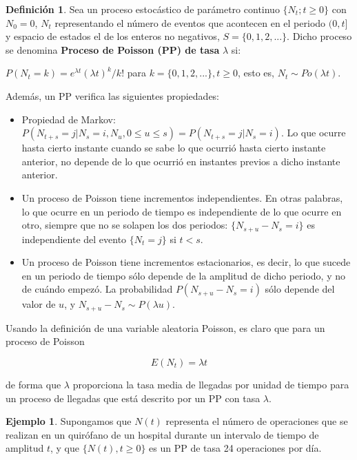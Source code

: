 \documentclass[
]{book}
\providecommand{\tightlist}{%
  \setlength{\itemsep}{0pt}\setlength{\parskip}{0pt}}
\newenvironment{yellowbox}{
  \definecolor{shadecolor}{rgb}{210, 180, 140}  
  \color{black}
  \begin{shaded}}
 {\end{shaded}}
\theoremstyle{definition}
\newtheorem{definition}{Definición}[chapter]
\theoremstyle{definition}
\newtheorem{example}{Ejemplo}[chapter]
\theoremstyle{definition}
\theoremstyle{definition}
\theoremstyle{remark}
\begin{document}
\begin{yellowbox}

\begin{definition}

Sea un proceso estocástico de parámetro continuo \(\{N_t; t \geq 0\}\) con \(N_0 = 0\), \(N_t\) representando el número de eventos que acontecen en el periodo \((0,t]\) y espacio de estados el de los enteros no negativos, \(S=\{0,1,2,...\}\). Dicho proceso se denomina \textbf{Proceso de Poisson (PP) de tasa} \(\lambda\) si:

\(P(N_t = k) = e^{\lambda t}(\lambda t)^k/k!\) para \(k=\{0,1,2,...\}, t \geq 0\), esto es, \(N_t \sim Po(\lambda t)\).

Además, un PP verifica las siguientes propiedades:

\begin{itemize}
\tightlist
\item
  Propiedad de Markov: \(P(N_{t+s} = j|N_s=i, N_u, 0\leq u \leq s)=P(N_{t+s} = j|N_s=i)\). Lo que ocurre hasta cierto instante cuando se sabe lo que ocurrió hasta cierto instante anterior, no depende de lo que ocurrió en instantes previos a dicho instante anterior.
\item
  Un proceso de Poisson tiene incrementos independientes. En otras palabras, lo que ocurre en un periodo de tiempo es independiente de lo que ocurre en otro, siempre que no se solapen los dos periodos: \(\{N_{s+u} - N_s = i\}\) es independiente del evento \(\{N_t = j\}\) si \(t<s\).
\item
  Un proceso de Poisson tiene incrementos estacionarios, es decir, lo que sucede en un periodo de tiempo sólo depende de la amplitud de dicho periodo, y no de cuándo empezó. La probabilidad \(P(N_{s+u} - N_s = i)\) sólo depende del valor de \(u\), y \(N_{s+u} - N_s \sim P(\lambda u)\).
\end{itemize}

\end{definition}

\end{yellowbox}

Usando la definición de una variable aleatoria Poisson, es claro que para un proceso de Poisson

\[E(N_t) = \lambda t\]

de forma que \(\lambda\) proporciona la tasa media de llegadas por unidad de tiempo para un proceso de llegadas que está descrito por un PP con tasa \(\lambda\).

\begin{example}
\protect\hypertarget{exm:pp000}{}\label{exm:pp000}Supongamos que \(N(t)\) representa el número de operaciones que se realizan en un quirófano de un hospital durante un intervalo de tiempo de amplitud \(t\), y que \(\{N(t), t\geq0\}\) es un PP de tasa 24 operaciones por día.
\end{example}
\end{document}
